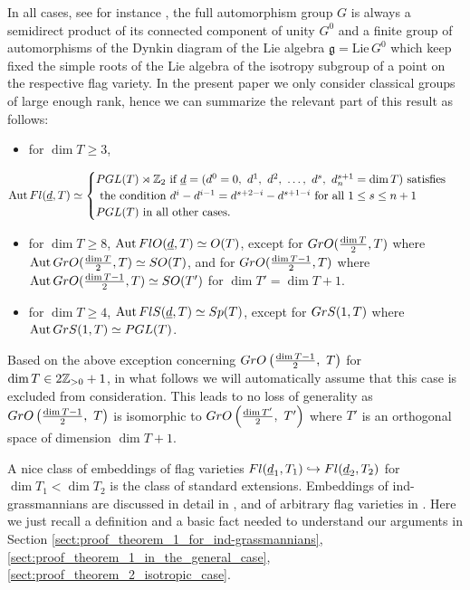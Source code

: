 \documentclass[11pt, a4paper]{article}
\begin{document}
In all cases, see for instance \cite[Section 3.3]{Akhiezer}, the full automorphism group $G$ is always a semidirect product of its connected component of unity $G^0$ and a finite group %
of automorphisms of the Dynkin diagram  of the Lie algebra $\mathfrak{g}=\mathrm{Lie}\, G^0$ which keep fixed 
the simple roots of the Lie algebra of the isotropy subgroup of a point on the respective flag variety. In the present paper we only consider classical groups of large enough rank, hence we can summarize the relevant part of this result as follows:
\begin{itemize}
    \item for $\dim T\geq 3$, 
    \end{itemize}
    $$\mathrm{Aut}\, \Fl (\underline{d},T)\simeq \begin{cases} \Pro \GL(T) \rtimes \Zp_2 \text{ if } \underline{d}=(d^0=0,~d^1,~d^2,~\ldots,~d^s,~d_n^{s+1}=\dim T)\text{ satisfies  }  %
    \\ \text{ the condition } d^i-d^{i-1}=d^{s+2-i}-d^{s+1-i}\text{ for all } 1\leq s\leq n+1
    \\
    \PGL(T) \text{ in all other cases. } \end{cases}$$ 
    \begin{itemize}
    \item for $\dim T\geq 8$, $\mathrm{Aut}\, FlO (\underline{d},T)\simeq O (T)$, except for $GrO(\frac{\dim T}{2},T)$ where $\mathrm{Aut}\, GrO(\frac{\dim T}{2},T)\simeq SO (T)$, and for $GrO(\frac{\dim T-1}{2},T)$ where $\mathrm{Aut}\, GrO(\frac{\dim T-1}{2},T)\simeq SO (T')$ for $\dim T'=\dim T +1$.
    \item for $\dim T\geq 4$, $\mathrm{Aut}\, FlS(\underline{d},T)\simeq Sp(T)$, except for $GrS(1,T)$ where  $\mathrm{Aut}\,GrS(1,T)\simeq P GL(T)$.
\end{itemize}
Based on the above exception concerning $GrO\left(\frac{\dim T -1}{2},~T\right)$ for $\dim T\in 2\mathbb{Z}_{>0}+1$, in what follows we will automatically assume that this case is excluded from consideration. This leads to no loss of generality as $GrO\left(\frac{\dim T -1}{2},~T\right)$ is isomorphic to $GrO\left(\frac{\dim T'}{2},~T'\right)$ where $T'$ is an orthogonal space of dimension $\dim T+1$.

A nice class of embeddings of flag varieties 
$Fl(\underline{d}_1,T_1)\hookrightarrow Fl(\underline{d}_2,T_2)$ for $\dim T_1<\dim T_2$ is the class of standard extensions. Embeddings of ind-grassmannians are discussed in detail in \cite{PenkovTikhomirov1}, and of arbitrary flag varieties in \cite{PenkovTikhomirov2}. %
Here we just recall a definition and a basic fact needed to understand our arguments in Section \ref{sect:proof_theorem_1_for_ind-grassmannians}, \ref{sect:proof_theorem_1_in_the_general_case}, \ref{sect:proof_theorem_2_isotropic_case}.%
\end{document}
